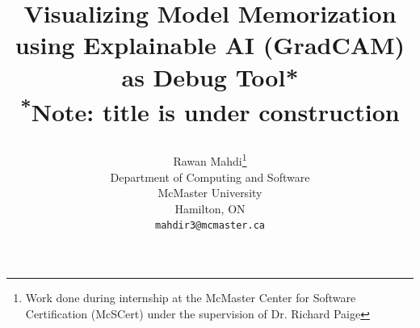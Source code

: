 \documentclass[conference]{IEEEtran}
\begin{document}
\title{Visualizing Model Memorization using Explainable AI (GradCAM) as Debug Tool*\\
{\footnotesize \textsuperscript{*}Note: title is under construction}
\author{
Rawan Mahdi\thanks{ Work done during internship at the McMaster Center for Software Certification (McSCert) under the supervision of Dr. Richard Paige} \\
Department of Computing and Software\\
McMaster University\\
Hamilton, ON  \\
\texttt{mahdir3@mcmaster.ca} \\
}
}

\maketitle


%

\end{document}
